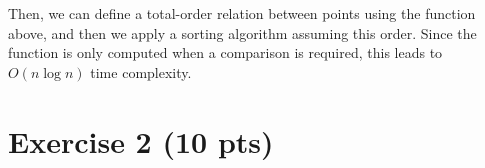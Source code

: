 \documentclass[a4paper]{article}
\begin{document}
    
    


Then, we can define a total-order relation between points using the function above, and then we apply a sorting algorithm assuming this order. Since the function is only computed when a comparison is required, this leads to $O(n \log n)$ time complexity.


\section*{Exercise 2 (10 pts)}
\end{document}
